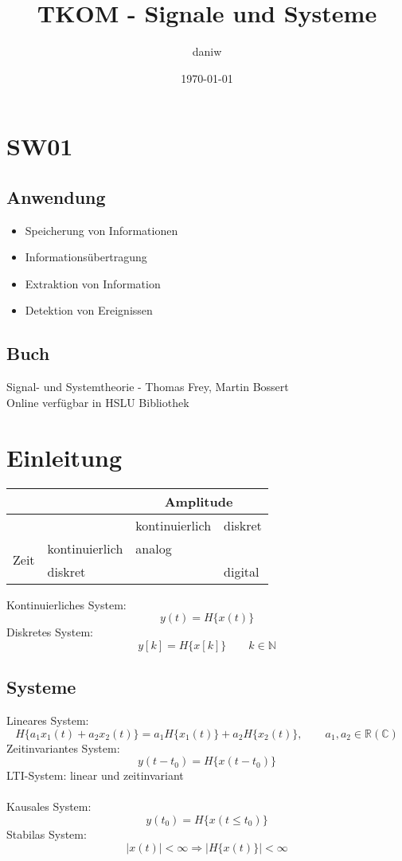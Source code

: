 \documentclass[a4paper, 10pt, fleqn]{article}
\title{TKOM - Signale und Systeme}
\author{daniw}
\date{\today}
\begin{document}
\maketitle

\clearpage

\tableofcontents

\clearpage

\section{SW01}
\subsection{Anwendung}
\begin{itemize}
    \item Speicherung von Informationen
    \item Informationsübertragung
    \item Extraktion von Information
    \item Detektion von Ereignissen
\end{itemize}
\subsection{Buch}
Signal- und Systemtheorie - Thomas Frey, Martin Bossert \\
Online verfügbar in HSLU Bibliothek

\section{Einleitung}
\begin{tabular}{|l|l|l|l|}
\hline                         &                   & \multicolumn{2}{|c|}{Amplitude} \\
\hline                         &                   & kontinuierlich    & diskret \\
\hline \multirow{2}{*}{Zeit}   & kontinuierlich    & analog            & \\
\cline{2-4}                    & diskret           &                   & digital   \\
\hline
\end{tabular}

Kontinuierliches System: 
\[ y(t) = H\{x(t)\} \]
Diskretes System: 
\[ y[k] = H\{x[k]\} \qquad k \in \mathbb{N} \]

\subsection{Systeme}
Lineares System: 
\[ H\{a_1 x_1(t) + a_2 x_2(t)\} = a_1 H\{x_1(t)\} + a_2 H\{x_2(t)\}, \qquad a_1, a_2 \in \mathbb{R}(\mathbb{C}) \]
Zeitinvariantes System: 
\[ y(t - t_0) = H\{x(t - t_0)\} \]
LTI-System: linear und zeitinvariant \\\\
Kausales System: 
\[ y(t_0) = H\{x(t \leq t_0)\} \]
Stabilas System:
\[ |x(t)| < \infty \Rightarrow |H\{x(t)\}| < \infty \]
\end{document}
